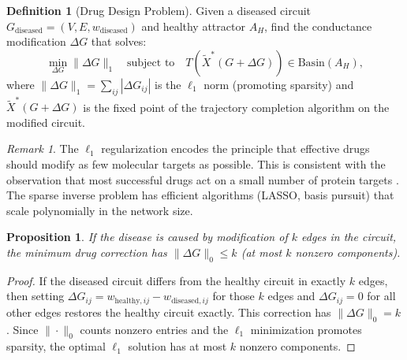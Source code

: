 \documentclass[twocolumn,10pt,a4paper]{article}
\newtheorem{proposition}[theorem]{Proposition}
\theoremstyle{definition}
\newtheorem{definition}[theorem]{Definition}
\theoremstyle{remark}
\newtheorem{remark}[theorem]{Remark}
\begin{document}
\begin{definition}[Drug Design Problem]
\label{def:drug_design}
Given a diseased circuit $G_{\mathrm{diseased}} = (V, E, w_{\mathrm{diseased}})$ and healthy attractor $A_H$, find the conductance modification $\Delta G$ that solves:
\begin{equation}
    \min_{\Delta G} \|\Delta G\|_1 \quad \text{subject to} \quad T(\tilde{X}^*(G + \Delta G)) \in \mathrm{Basin}(A_H),
    \label{eq:drug_design}
\end{equation}
where $\|\Delta G\|_1 = \sum_{ij} |\Delta G_{ij}|$ is the $\ell_1$ norm (promoting sparsity) and $\tilde{X}^*(G + \Delta G)$ is the fixed point of the trajectory completion algorithm on the modified circuit.
\end{definition}

\begin{remark}
The $\ell_1$ regularization encodes the principle that effective drugs should modify as few molecular targets as possible. This is consistent with the observation that most successful drugs act on a small number of protein targets \citep{Alon2007book}. The sparse inverse problem has efficient algorithms (LASSO, basis pursuit) that scale polynomially in the network size.
\end{remark}

\begin{proposition}
\label{prop:drug_sparse}
If the disease is caused by modification of $k$ edges in the circuit, the minimum drug correction has $\|\Delta G\|_0 \leq k$ (at most $k$ nonzero components).
\end{proposition}

\begin{proof}
If the diseased circuit differs from the healthy circuit in exactly $k$ edges, then setting $\Delta G_{ij} = w_{\mathrm{healthy},ij} - w_{\mathrm{diseased},ij}$ for those $k$ edges and $\Delta G_{ij} = 0$ for all other edges restores the healthy circuit exactly. This correction has $\|\Delta G\|_0 = k$. Since $\|\cdot\|_0$ counts nonzero entries and the $\ell_1$ minimization promotes sparsity, the optimal $\ell_1$ solution has at most $k$ nonzero components.
\end{proof}
\end{document}
